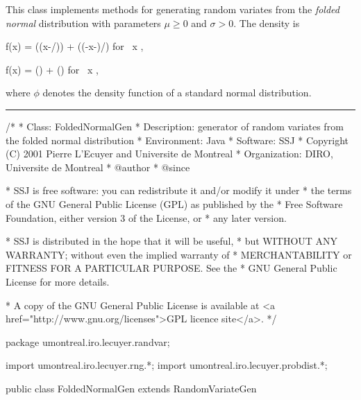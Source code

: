 
This class implements methods for generating random variates from the 
{\em folded normal\/} distribution  with
parameters $\mu \ge 0$  and $\sigma > 0$.
The density is
\begin{htmlonly}
\eq
  f(x) = \phi \left((x-\mu/)\sigma\right) + \phi \left((-x-\mu)/\sigma\right) 
   \qquad \mbox {for  } x ,
\endeq
\end{htmlonly}
\begin{latexonly} 
\eq
 f(x) = \phi \left(\right) + 
        \phi \left(\right) 
   \qquad \mbox {for  } x ,   
\endeq
\end{latexonly}
where $ \phi $ denotes the density function of a standard normal distribution.

\bigskip\hrule

\begin{code}
\begin{hide}
/*
 * Class:        FoldedNormalGen
 * Description:  generator of random variates from the folded normal distribution
 * Environment:  Java
 * Software:     SSJ 
 * Copyright (C) 2001  Pierre L'Ecuyer and Universite de Montreal
 * Organization: DIRO, Universite de Montreal
 * @author       
 * @since

 * SSJ is free software: you can redistribute it and/or modify it under
 * the terms of the GNU General Public License (GPL) as published by the
 * Free Software Foundation, either version 3 of the License, or
 * any later version.

 * SSJ is distributed in the hope that it will be useful,
 * but WITHOUT ANY WARRANTY; without even the implied warranty of
 * MERCHANTABILITY or FITNESS FOR A PARTICULAR PURPOSE.  See the
 * GNU General Public License for more details.

 * A copy of the GNU General Public License is available at
   <a href="http://www.gnu.org/licenses">GPL licence site</a>.
 */
\end{hide}
package umontreal.iro.lecuyer.randvar;\begin{hide}
import umontreal.iro.lecuyer.rng.*;
import umontreal.iro.lecuyer.probdist.*;
\end{hide}

public class FoldedNormalGen extends RandomVariateGen \begin{hide} {
    
   // Distribution parameters
   protected double mu;
   protected double sigma;
\end{hide}
\end{code}

